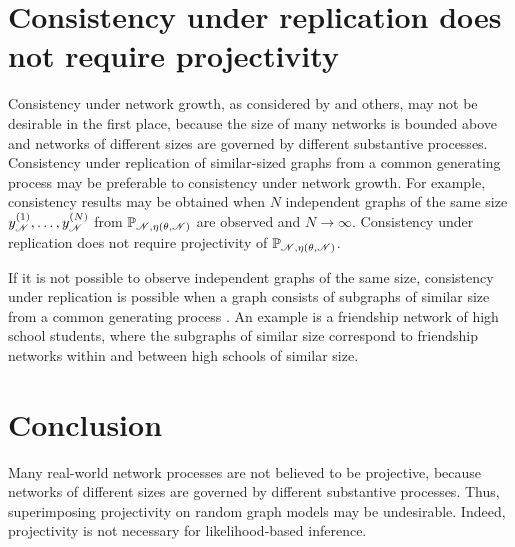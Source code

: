 \documentclass[12pt]{article}
\begin{document}
\section{Consistency under replication does not require projectivity}

Consistency under network growth,
as considered by \citet{ShRi11} and others, 
may not be desirable in the first place, 
because the size of many networks is bounded above and networks of different sizes are governed by different substantive processes. 
Consistency under replication of similar-sized graphs from a common generating process may be preferable to consistency under network growth.
For example,
consistency results may be obtained when $N$ independent graphs of the same size $y_{\mathscr{N}}^{(1)}, \ldots,y_{\mathscr{N}}^{(N)}$ from $\mathbb{P}_{\mathscr{N},\eta(\theta, \mathscr{N})}$ are observed and $N \to \infty$.
Consistency under replication does not require projectivity of $\mathbb{P}_{\mathscr{N},\eta(\theta, \mathscr{N})}$.

If it is not possible to observe independent graphs of the same size,
consistency under replication is possible when a graph consists of subgraphs of similar size from a common generating process \citep{ScHa13,ScSt16}.
An example is a friendship network of high school students,
where the subgraphs of similar size correspond to friendship networks within and between high schools of similar size.

\section{Conclusion}

Many real-world network processes are not believed to be projective,
because networks of different sizes are governed by different substantive processes.
Thus,
superimposing projectivity on random graph models may be undesirable.
Indeed,
projectivity is not necessary for likelihood-based inference.


%

%


\end{document}
